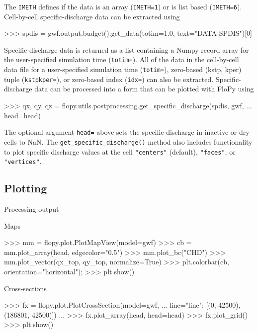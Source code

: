 \documentclass[11pt, oneside]{article}  	%
\begin{document}
\noindent The \texttt{IMETH} defines if the data is an array (\texttt{IMETH=1}) or is list based (\texttt{IMETH=6}). Cell-by-cell specific-discharge data can be extracted using

\begin{python}
>>> spdis = gwf.output.budget().get_data(totim=1.0, text="DATA-SPDIS")[0]
\end{python}

\noindent Specific-discharge data is returned as a list containing a Numpy record array for the user-specified simulation time (\texttt{totim=}). All of the data in the cell-by-cell data file for a user-specified simulation time (\texttt{totim=}), zero-based (kstp, kper) tuple (\texttt{kstpkper=}), or zero-based index (\texttt{idx=}) can also be extracted. Specific-discharge data can be processed into a form that can be plotted with FloPy using 

\begin{python}
>>> qx, qy, qz = flopy.utils.postprocessing.get_specific_discharge(spdis, gwf, 
... head=head)
\end{python}

\noindent The optional argument \texttt{head=} above sets the specific-discharge in inactive or dry cells to NaN. The \texttt{get\_specific\_discharge()} method also includes functionality to plot specific discharge values at the cell \texttt{"centers"} (default), \texttt{"faces"}, or \texttt{"vertices"}. 

\subsection{Plotting}

Processing output

Maps

\begin{python}
>>> mm = flopy.plot.PlotMapView(model=gwf)
>>> cb = mm.plot_array(head, edgecolor="0.5")
>>> mm.plot_bc("CHD")
>>> mm.plot_vector(qx_top, qy_top, normalize=True)
>>> plt.colorbar(cb, orientation="horizontal");
>>> plt.show()
\end{python}

Cross-sections 

\begin{python}
>>> fx = flopy.plot.PlotCrossSection(model=gwf, 
... line={"line": [(0, 42500), (186801, 42500)]})
...
>>> fx.plot_array(head, head=head)
>>> fx.plot_grid()
>>> plt.show()
\end{python}
\end{document}
